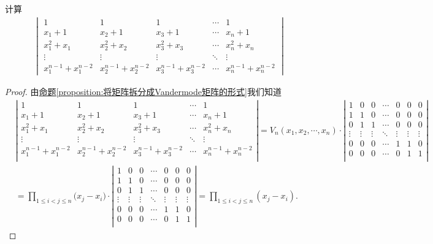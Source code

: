 \documentclass[../../main.tex]{subfiles}
\begin{document}
\begin{example}
计算
\begin{align*}
\begin{vmatrix}
1&1&1&\cdots&1\\
x_1 + 1&x_2 + 1&x_3 + 1&\cdots&x_n + 1\\
x_1^2 + x_1&x_2^2 + x_2&x_3^2 + x_3&\cdots&x_n^2 + x_n\\
\vdots&\vdots&\vdots&\ddots&\vdots\\
x_1^{n - 1} + x_1^{n - 2}&x_2^{n - 1} + x_2^{n - 2}&x_3^{n - 1} + x_3^{n - 2}&\cdots&x_n^{n - 1} + x_n^{n - 2}
\end{vmatrix}
\end{align*}
\end{example}
\begin{proof}
由\hyperref[proposition:将矩阵拆分成Vandermode矩阵的形式]{命题\ref{proposition:将矩阵拆分成Vandermode矩阵的形式}}我们知道
\begin{align*}
&\left| \begin{matrix}
1&		1&		1&		\cdots&		1\\
x_1+1&		x_2+1&		x_3+1&		\cdots&		x_n+1\\
x_{1}^{2}+x_1&		x_{2}^{2}+x_2&		x_{3}^{2}+x_3&		\cdots&		x_{n}^{2}+x_n\\
\vdots&		\vdots&		\vdots&		\ddots&		\vdots\\
x_{1}^{n-1}+x_{1}^{n-2}&		x_{2}^{n-1}+x_{2}^{n-2}&		x_{3}^{n-1}+x_{3}^{n-2}&		\cdots&		x_{n}^{n-1}+x_{n}^{n-2}\\
\end{matrix} \right|=V_n\left( x_1,x_2,\cdots ,x_n \right) \cdot \left| \begin{matrix}
1&		0&		0&		\cdots&		0&		0&		0\\
1&		1&		0&		\cdots&		0&		0&		0\\
0&		1&		1&		\cdots&		0&		0&		0\\
\vdots&		\vdots&		\vdots&		\ddots&		\vdots&		\vdots&		\vdots\\
0&		0&		0&		\cdots&		1&		1&		0\\
0&		0&		0&		\cdots&		0&		1&		1\\
\end{matrix} \right|
\\
&=\prod_{1\le i<j\le n}{(x_j}-x_i)\cdot \left| \begin{matrix}
1&		0&		0&		\cdots&		0&		0&		0\\
1&		1&		0&		\cdots&		0&		0&		0\\
0&		1&		1&		\cdots&		0&		0&		0\\
\vdots&		\vdots&		\vdots&		\ddots&		\vdots&		\vdots&		\vdots\\
0&		0&		0&		\cdots&		1&		1&		0\\
0&		0&		0&		\cdots&		0&		1&		1\\
\end{matrix} \right|=\prod_{1\le i<j\le n}{\left( x_j-x_i \right)}.
\end{align*} 
\end{proof}
\end{document}
